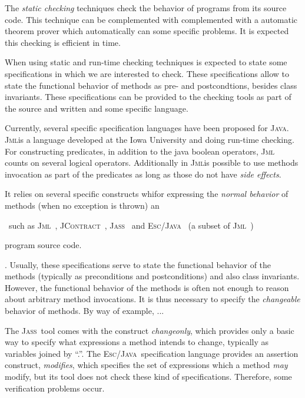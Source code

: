 \documentclass[a4paper]{llncs}
\newcommand{\jml}{\textsc{Jml}}
\newcommand{\escj}{\textsc{Esc/Java}}
\newcommand{\jass}{\textsc{Jass}}
\newcommand{\jcontract}{\textsc{JContract}}
\newcommand{\java}{\textsc{Java}}
\newcommand{\eiff}{\textsc{Eiffel}}
\newcommand{\modifies}{\textit{modifies}}
\begin{document}
The \emph{static checking} techniques check the behavior of programs
from its source code. This technique can be complemented with
complemented with a automatic theorem prover which automatically can
some specific problems. It is expected this checking is efficient in
time.

When using static and run-time checking techniques is expected to
state some specifications in which we are interested to check. These
specifications allow to state the functional behavior of methods as
pre- and postcondtions, besides class invariants. These specifications
can be provided to the checking tools as part of the source and
written and some specific language. 

Currently, several specific specification languages have been proposed
for \java. \jml is a language developed at the Iowa University and
doing run-time checking. For constructing predicates, in addition to
the java boolean operators, 
\jml~ counts on several logical operators. Additionally in \jml is
possible to use methods invocation as part of the predicates as long
as those do not have \emph{side effects}.

It relies on several specific constructs whifor
expressing the \emph{normal behavior} of methods (when no exception is 
thrown) an 

~such as
\jml~\cite{LeavensBR00}, \jcontract~\cite{JContractUrl},
\jass~\cite{JassUrl} and \escj~\cite{LeinoNS00} (a subset of
\jml~\cite{EscJmlDiff})



program source code. 



. Usually, these specifications serve to state
the functional behavior of the methods (typically as preconditions and
postconditions) and also class invariants. However, the
functional behavior of the methods is often not enough to reason about
arbitrary method invocations. It is thus necessary to specify the
\emph{changeable} behavior of methods. By way of example, ...

The \jass~tool comes with the construct \textit{changeonly}, which
provides only a basic way to specify what expressions a method intends
to change, typically as variables joined by ``.''. The
\escj~specification
language provides an assertion construct,
\modifies, which specifies the set of expressions which a method
\emph{may} modify, but its tool does not check these kind of
specifications. Therefore, some verification problems occur.
\end{document}
